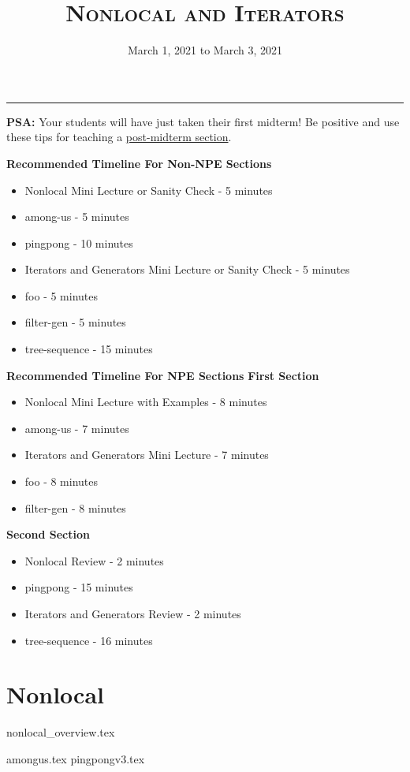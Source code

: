 \documentclass{exam}
\title{\textsc{Nonlocal and Iterators}}
\date{March 1, 2021 to March 3, 2021}
\begin{document}
	\maketitle
	\rule{\textwidth}{0.15em}
	\fontsize{12}{15}\selectfont

\begin{guide}
    \textbf{PSA: }Your students will have just taken their first midterm! Be positive and use these tips for teaching a \href{https://docs.google.com/document/d/1Oj0Cmm_HKPOU3YsdBWu1VDF2O1nLYBO_VWaczuGMc8g/edit}{post-midterm section}.

	\textbf{Recommended Timeline For Non-NPE Sections}
	\begin{itemize}
		\item Nonlocal Mini Lecture or Sanity Check - 5 minutes
		\item among-us - 5 minutes
		\item pingpong - 10 minutes
		\item Iterators and Generators Mini Lecture or Sanity Check - 5 minutes
		\item foo - 5 minutes
		\item filter-gen - 5 minutes
		\item tree-sequence - 15 minutes
	\end{itemize}
	\textbf{Recommended Timeline For NPE Sections}
	\textbf{First Section}
	\begin{itemize}
		\item Nonlocal Mini Lecture with Examples - 8 minutes
		\item among-us - 7 minutes
		\item Iterators and Generators Mini Lecture - 7 minutes
		\item foo - 8 minutes
		\item filter-gen - 8 minutes
	\end{itemize}
	\textbf{Second Section}
	\begin{itemize}
		\item Nonlocal Review - 2 minutes
		\item pingpong - 15 minutes
		\item Iterators and Generators Review - 2 minutes
		\item tree-sequence - 16 minutes
	\end{itemize}
\end{guide}

\section{Nonlocal}
{nonlocal_overview.tex}
\begin{questions}
	{amongus.tex}
	{pingpongv3.tex}
\end{questions}
\vspace{-4em}
\end{document}
